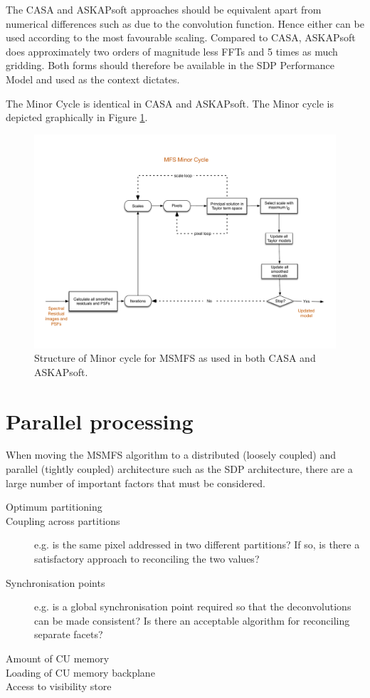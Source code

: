 \documentclass[11pt,a4paper,variablewidth]{article}
\begin{document}
The CASA and ASKAPsoft approaches should be equivalent apart from numerical differences such as due to the convolution function. Hence either can be used according to the most favourable scaling. Compared to CASA, ASKAPsoft does approximately two orders of magnitude less FFTs and 5 times as much gridding. Both forms should therefore be available in the SDP Performance Model and used as the context dictates.

The Minor Cycle is identical in CASA and ASKAPsoft. The Minor cycle is depicted graphically in Figure \ref{fig:minor}.

\begin{figure}[htb]
  \centering
  \includegraphics[width=\textwidth]{./MSMFS_Minor.pdf}
  \caption{Structure of Minor cycle for MSMFS as used in both CASA and ASKAPsoft.}
  \label{fig:minor}
\end{figure}


\clearpage
\section{Parallel processing}
\label{sec:parallel}

When moving the MSMFS algorithm to a distributed (loosely coupled) and parallel (tightly coupled) architecture such as the SDP architecture, there are a large number of important factors that must be considered.
\begin{description}
\item[Optimum partitioning] 
\item[Coupling across partitions] e.g. is the same pixel addressed in two different partitions? If so, is there a satisfactory approach to reconciling the two values?
\item[Synchronisation points] e.g. is a global synchronisation point required so that the deconvolutions can be made consistent? Is there an acceptable algorithm for reconciling separate facets?
\item[Amount of CU memory]
\item[Loading of CU memory backplane]
\item[Access to visibility store]
\end{description}
\end{document}
